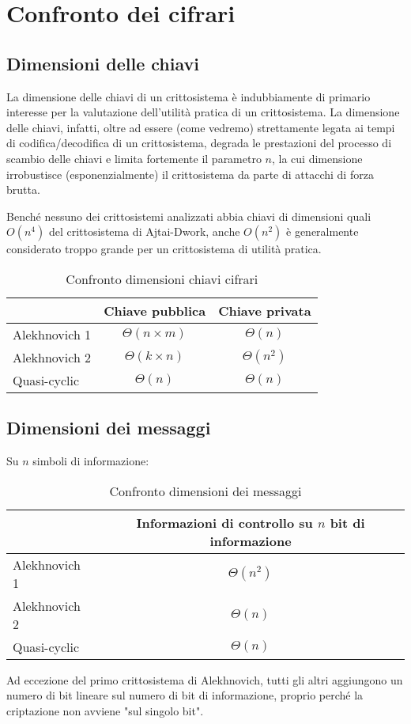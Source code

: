 \documentclass[12pt, a4paper]{report}
\theoremstyle{definition}
\begin{document}
		\section{Confronto dei cifrari}
			\subsection{Dimensioni delle chiavi}
				La dimensione delle chiavi di un crittosistema è indubbiamente di primario interesse per la valutazione dell'utilità pratica di un crittosistema. La dimensione delle chiavi, infatti, oltre ad essere (come vedremo) strettamente legata ai tempi di codifica/decodifica di un crittosistema, degrada le prestazioni del processo di scambio delle chiavi e limita fortemente il parametro $n$, la cui dimensione irrobustisce (esponenzialmente) il crittosistema da parte di attacchi di forza brutta.
				
				Benché nessuno dei crittosistemi analizzati abbia chiavi di dimensioni quali $O(n^4)$ del crittosistema di Ajtai-Dwork, anche $O(n^2)$ è generalmente considerato troppo grande per un crittosistema di utilità pratica.
			
				\begin{table}[ht]
					\centering
					\begin{tabular}[t]{lcc}
						\hline
						&Chiave pubblica&Chiave privata\\
						\hline
							Alekhnovich 1&$\Theta(n\times m)$&$\Theta(n)$\\
							Alekhnovich 2&$\Theta(k\times n)$&$\Theta(n^2)$\\
							Quasi-cyclic&$\Theta(n)$&$\Theta(n)$\\
						\hline
					\end{tabular}
					\caption{Confronto dimensioni chiavi cifrari}
				\end{table}
			\subsection{Dimensioni dei messaggi}
				Su $n$ simboli di informazione:
				\begin{table}[H]
					\centering
					\begin{tabular}[t]{lc}
						\hline
						&Informazioni di controllo su $n$ bit di informazione\\
						\hline
						Alekhnovich 1&$\Theta(n^2)$\\
						Alekhnovich 2&$\Theta(n)$\\
						Quasi-cyclic&$\Theta(n)$\\
						\hline
					\end{tabular}
					\caption{Confronto dimensioni dei messaggi}
				\end{table}
				Ad eccezione del primo crittosistema di Alekhnovich, tutti gli altri aggiungono un numero di bit lineare sul numero di bit di informazione, proprio perché la criptazione non avviene "sul singolo bit".
\end{document}
